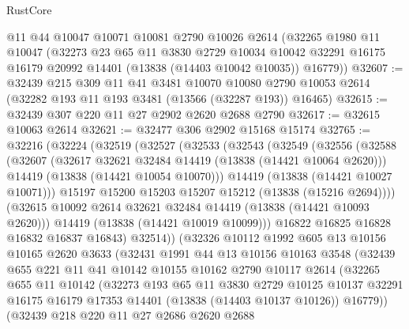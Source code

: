 \begin{lexlean}{RustCore}
\begin{coremodule}
    @11
    @44
    @10047
    @10071
    @10081
    @2790
    @10026
    @2614
    (@32265
      @1980
      @11
      @10047
      (@32273
        @23
        @65
        @11
        @3830
        @2729
        @10034
        @10042
        @32291
        @16175
        @16179
        @20992
        @14401
        (@13838 (@14403 @10042 @10035))
        @16779))
@32607 := @32439
    @215
    @309
    @11
    @41
    @3481
    @10070
    @10080
    @2790
    @10053
    @2614
    (@32282 @193 @11 @193 @3481 (@13566 (@32287 @193)) @16465)
@32615 := @32439 @307 @220 @11 @27 @2902 @2620 @2688 @2790
@32617 := @32615 @10063 @2614
@32621 := @32477 @306 @2902 @15168 @15174
@32765 := @32216
    (@32224
      (@32519
        (@32527
          (@32533
            (@32543
              (@32549
                (@32556
                  (@32588
                    (@32607
                      (@32617 @32621 @32484 @14419 (@13838 (@14421 @10064 @2620)))
                      @14419
                      (@13838 (@14421 @10054 @10070)))
                    @14419
                    (@13838 (@14421 @10027 @10071)))
                  @15197
                  @15200
                  @15203
                  @15207
                  @15212
                  (@13838 (@15216 @2694))))
              (@32615 @10092 @2614 @32621 @32484 @14419 (@13838 (@14421 @10093 @2620)))
              @14419
              (@13838 (@14421 @10019 @10099)))
            @16822
            @16825
            @16828
            @16832
            @16837
            @16843)
          @32514))
      (@32326
        @10112
        @1992
        @605
        @13
        @10156
        @10165
        @2620
        @3633
        (@32431
          @1991
          @44
          @13
          @10156
          @10163
          @3548
          (@32439
            @655
            @221
            @11
            @41
            @10142
            @10155
            @10162
            @2790
            @10117
            @2614
            (@32265
              @655
              @11
              @10142
              (@32273
                @193
                @65
                @11
                @3830
                @2729
                @10125
                @10137
                @32291
                @16175
                @16179
                @17353
                @14401
                (@13838 (@14403 @10137 @10126))
                @16779))
            (@32439
              @218
              @220
              @11
              @27
              @2686
              @2620
              @2688

\end{coremodule}
\end{lexlean}
